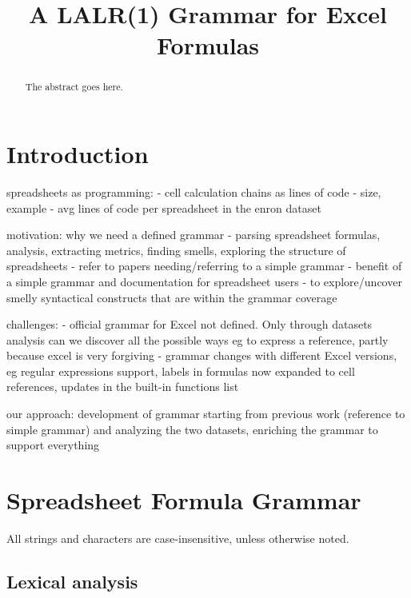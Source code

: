 \documentclass[conference]{IEEEtran}
\begin{document}
\title{A LALR(1) Grammar for Excel Formulas}

\maketitle


\begin{abstract}

The abstract goes here.
\end{abstract}

\IEEEpeerreviewmaketitle


\section{Introduction}

spreadsheets as programming:
- cell calculation chains as lines of code - size, example
- avg lines of code per spreadsheet in the enron dataset

motivation: why we need a defined grammar
- parsing spreadsheet formulas, analysis, extracting metrics, finding smells, exploring the structure of spreadsheets
- refer to papers needing/referring to a simple grammar
- benefit of a simple grammar and documentation for spreadsheet users
- to explore/uncover smelly syntactical constructs that are within the grammar coverage

challenges:
- official grammar for Excel not defined. Only through datasets analysis can we discover all the possible ways eg to 
express a reference, partly because excel is very forgiving
- grammar changes with different Excel versions, eg regular expressions support, labels in formulas now expanded to cell
references, updates in the built-in functions list

our approach:
development of grammar starting from previous work (reference to simple grammar) and analyzing the two datasets, enriching the
grammar to support everything

\section{Spreadsheet Formula Grammar}

All strings and characters are case-insensitive, unless otherwise noted.

\subsection{Lexical analysis}
\end{document}
